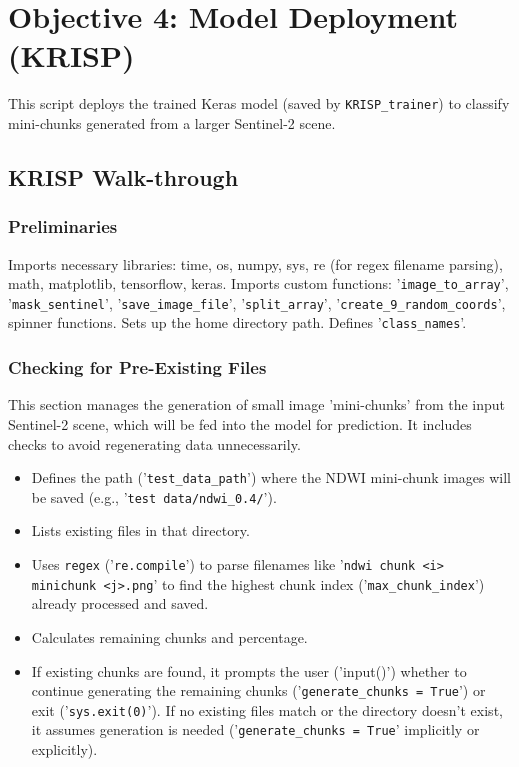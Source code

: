 \section{Objective 4: Model Deployment (KRISP)}
This script deploys the trained Keras model (saved by \verb|KRISP_trainer|) to classify mini-chunks generated from a larger Sentinel-2 scene.

\subsection{KRISP Walk-through}

\subsubsection{Preliminaries}
Imports necessary libraries: time, os, numpy, sys, re (for regex filename parsing), math, matplotlib, tensorflow, keras. Imports custom functions: '\verb|image_to_array|', '\verb|mask_sentinel|', '\verb|save_image_file|', '\verb|split_array|', '\verb|create_9_random_coords|', spinner functions. Sets up the home directory path. Defines '\verb|class_names|'.

\subsubsection{Checking for Pre-Existing Files}
This section manages the generation of small image 'mini-chunks' from the input Sentinel-2 scene, which will be fed into the model for prediction. It includes checks to avoid regenerating data unnecessarily.
\begin{itemize}
    \item Defines the path ('\verb|test_data_path|') where the NDWI mini-chunk images will be saved (e.g., '\verb|test data/ndwi_0.4/|').
    \item Lists existing files in that directory.
    \item Uses \verb|regex| ('\verb|re.compile|') to parse filenames like '\verb|ndwi chunk <i> minichunk <j>.png|' to find the highest chunk index ('\verb|max_chunk_index|') already processed and saved.
    \item Calculates remaining chunks and percentage.
    \item If existing chunks are found, it prompts the user ('input()') whether to continue generating the remaining chunks ('\verb|generate_chunks = True|') or exit ('\verb|sys.exit(0)|'). If no existing files match or the directory doesn't exist, it assumes generation is needed ('\verb|generate_chunks = True|' implicitly or explicitly).
\end{itemize}

